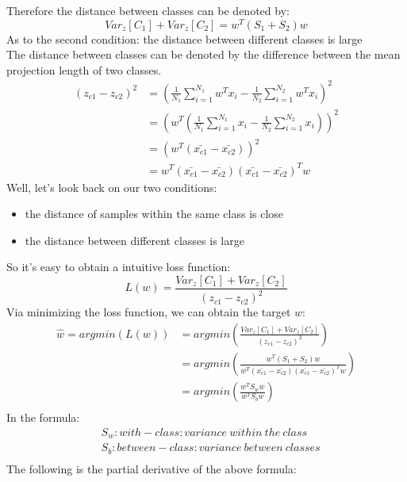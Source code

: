 \documentclass{report}
\begin{document}
Therefore the distance between classes can be denoted by:
$$
Var_z[C_1]+Var_z[C_2]=w^T(S_1+S_2)w
$$
As to the second condition: the distance between different classes is large\\
The distance between classes can be denoted by the difference between the mean projection length of two classes.
\begin{equation}
\begin{aligned}
(z_{c1}-z_{c2})^2&=(\frac{1}{N_1}\sum_{i=1}^{N_1}w^T x_i - \frac{1}{N_2}\sum_{i=1}^{N_2}w^T x_i)^2\\
&=(w^T(\frac{1}{N_1}\sum_{i=1}^{N_1} x_i - \frac{1}{N_2}\sum_{i=1}^{N_2} x_i))^2\\
&=(w^T(\bar{x_{c1}}-\bar{x_{c2}}))^2\\
&=w^T(\bar{x_{c1}}-\bar{x_{c2}})(\bar{x_{c1}}-\bar{x_{c2}})^T w
\end{aligned}
\end{equation}
Well, let's look back on our two conditions:
\begin{itemize}
	\item the distance of samples within the same class is close
	\item the distance between different classes is large
\end{itemize}
So it's easy to obtain a intuitive loss function:
\begin{equation}
L(w)=\frac{Var_z[C_1]+Var_z[C_2]}{(z_{c1}-z_{c2})^2}
\end{equation}
Via minimizing the loss function, we can obtain the target $w$:
\begin{equation}
\begin{aligned}
\hat{w}=argmin(L(w))&=argmin(\frac{Var_z[C_1]+Var_z[C_2]}{(z_{c1}-z_{c2})^2})\\
&=argmin(\frac{w^T(S_1+S_2)w}{w^T(\bar{x_{c1}}-\bar{x_{c2}})(\bar{x_{c1}}-\bar{x_{c2}})^T w})\\
&=argmin(\frac{w^T S_w w}{w^T S_b w})\\
\end{aligned}\end{equation}
In the formula:
\begin{equation}
\begin{aligned}
&S_w: with-class:variance\ within\ the\ class\\
&S_b: between-class:variance\ between\ classes\\
\end{aligned}
\end{equation}
The following is the partial derivative of the above formula:\\
\end{document}
